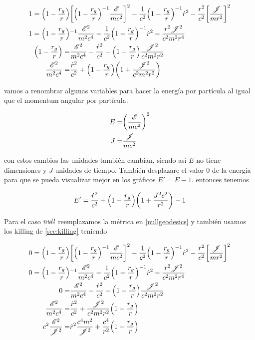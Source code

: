 \documentclass[../Main.tex]{subfiles}
\begin{document}
\begin{align}
    1 = \qty(1-\dfrac{r_{g}}{r}) & \qty[\qty(1-\dfrac{r_{g}}{r})^{-1}\dfrac{\mathscr{E}}{mc^{2}}]^{2} - \dfrac{1}{c^{2}}\qty(1-\dfrac{r_{g}}{r})^{-1}\dot{r}^{2} - \dfrac{r^{2}}{c^{2}}\qty[\dfrac{\mathscr{J}}{mr^{2}}]^{2} \\
    1 = \qty(1-\dfrac{r_{g}}{r}) & ^{-1} \dfrac{\mathscr{E}^{2}}{m^{2}c^{4}} - \dfrac{1}{c^{2}}\qty(1-\dfrac{r_{g}}{r})^{-1}\dot{r}^{2} - \dfrac{r^{2}\mathscr{J}^{2}}{c^{2}m^{2}r^{4}} \\
    \qty(1-\dfrac{r_{g}}{r}) = & \dfrac{\mathscr{E}^{2}}{m^{2}c^{4}} - \dfrac{\dot{r}^{2}}{c^{2}} - \qty(1-\dfrac{r_{g}}{r})\dfrac{\mathscr{J}^{2}}{c^{2}m^{2}r^{2}} \\ 
    \dfrac{\mathscr{E}^{2}}{m^{2}c^{4}} = & \dfrac{\dot{r}^{2}}{c^{2}} + \qty(1-\dfrac{r_{g}}{r})\qty(1 + \dfrac{\mathscr{J}^{2}}{c^{2}m^{2}r^{2}})
\end{align}

vamos a renombrar algunas variables para hacer la energía por partícula al igual que el momentum angular por partícula.

\begin{align}
    E = & \qty(\dfrac{\mathscr{E}}{mc^{2}})^{2} \\
    J = & \dfrac{\mathscr{J}}{mc^{2}}
\end{align}

con estos cambios las unidades también cambian, siendo así $E$ no tiene dimensiones y $J$ unidades de tiempo. También desplazare el valor 0 de la energía para que se pueda visualizar mejor en los gráficos $E'=E-1$.
entonces tenemos 

\begin{equation}
    E' = \dfrac{\dot{r}^{2}}{c^{2}} + \qty(1-\dfrac{r_{g}}{r})\qty(1 + \dfrac{J^{2}c^{2}}{r^{2}})-1
    \label{SchwarzschildEnergia}
\end{equation}

Para el caso $\textit{null}$ reemplazamos la métrica en \eqref{nullgeodesics} y también usamos los killing de \ref{sec:killing} teniendo

\begin{align}
    0 = \qty(1-\dfrac{r_{g}}{r}) & \qty[\qty(1-\dfrac{r_{g}}{r})^{-1}\dfrac{\mathscr{E}}{mc^{2}}]^{2} - \dfrac{1}{c^{2}}\qty(1-\dfrac{r_{g}}{r})^{-1}\dot{r}^{2} - \dfrac{r^{2}}{c^{2}}\qty[\dfrac{\mathscr{J}}{mr^{2}}]^{2} \\
    0 = \qty(1-\dfrac{r_{g}}{r}) & ^{-1} \dfrac{\mathscr{E}^{2}}{m^{2}c^{4}} - \dfrac{1}{c^{2}}\qty(1-\dfrac{r_{g}}{r})^{-1}\dot{r}^{2} - \dfrac{r^{2}\mathscr{J}^{2}}{c^{2}m^{2}r^{4}} \\
    0 = & \dfrac{\mathscr{E}^{2}}{m^{2}c^{4}} - \dfrac{\dot{r}^{2}}{c^{2}} - \qty(1-\dfrac{r_{g}}{r})\dfrac{\mathscr{J}^{2}}{c^{2}m^{2}r^{2}} \\ 
    \dfrac{\mathscr{E}^{2}}{m^{2}c^{4}} = & \dfrac{\dot{r}^{2}}{c^{2}} + \dfrac{\mathscr{J}^{2}}{c^{2}m^{2}r^{2}}\qty(1-\dfrac{r_{g}}{r}) \\
    c^{2}\dfrac{\mathscr{E}^{2}}{\mathscr{J}^{2}}= & \dot{r}^{2}\dfrac{c^{4}m^{2}}{\mathscr{J}^{2}} + \dfrac{c^{4}}{r^{2}}\qty(1-\dfrac{r_{g}}{r})
\end{align}
\end{document}
